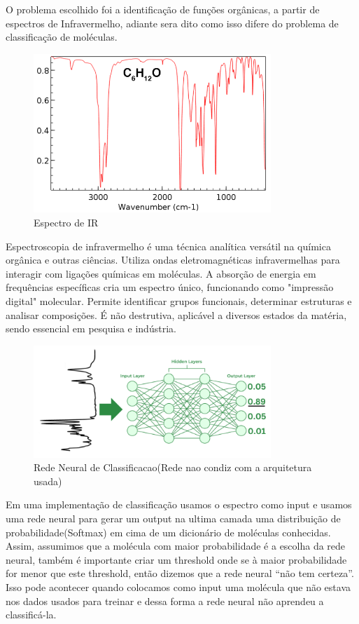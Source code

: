 \documentclass[11pt,a4paper]{article}
\begin{document}
O problema escolhido foi a identificação de funções orgânicas, a partir de espectros de Infravermelho, adiante sera dito como isso difere do problema de classificação de moléculas.


\begin{figure}[h]
    \centering
    \includegraphics[width=0.8\textwidth]{Images/spec.png}
    \caption{Espectro de IR}
    \label{fig:ir_spectrum}
\end{figure}

Espectroscopia de infravermelho é uma técnica analítica versátil na química orgânica e outras ciências. Utiliza ondas eletromagnéticas infravermelhas para interagir com ligações químicas em moléculas. A absorção de energia em frequências específicas cria um espectro único, funcionando como "impressão digital" molecular. Permite identificar grupos funcionais, determinar estruturas e analisar composições. É não destrutiva, aplicável a diversos estados da matéria, sendo essencial em pesquisa e indústria.

\begin{figure}[h]
    \centering
    \includegraphics[width=0.8\textwidth]{Images/NN2.png}
    \caption{Rede Neural de Classificacao(Rede nao condiz com a arquitetura usada)}
    \label{fig:ir_spectrum}
\end{figure}

Em uma implementação de classificação usamos o espectro como input e usamos uma rede neural para gerar um output na ultima camada uma distribuição de probabilidade(Softmax) em cima de um dicionário de moléculas conhecidas. Assim, assumimos que a molécula com maior probabilidade é a escolha da rede neural, também é importante criar um threshold onde se à maior probabilidade for menor que este threshold, então dizemos que a rede neural “não tem certeza”. Isso pode acontecer quando colocamos como input uma molécula que não estava nos dados usados para treinar e dessa forma a rede neural não aprendeu a classificá-la.
\end{document}
